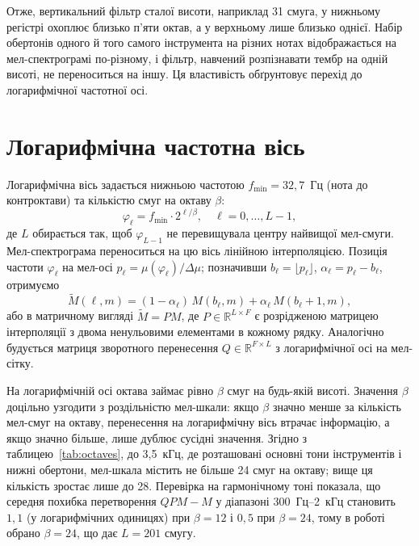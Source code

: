 Отже, вертикальний фільтр сталої висоти, наприклад 31 смуга, у нижньому
регістрі охоплює близько п'яти октав, а у верхньому лише близько однієї.
Набір обертонів одного й того самого інструмента на різних нотах
відображається на мел-спектрограмі по-різному, і фільтр, навчений
розпізнавати тембр на одній висоті, не переноситься на іншу. Ця
властивість обґрунтовує перехід до логарифмічної частотної осі.

\section{Логарифмічна частотна вісь}
\label{sec:logaxis}

Логарифмічна вісь задається нижньою частотою $f_{\min} = 32{,}7$~Гц (нота
до контроктави) та кількістю смуг на октаву $\beta$:
\begin{equation}
    \varphi_\ell = f_{\min} \cdot 2^{\ell / \beta}, \quad \ell = 0, \ldots, L-1,
\end{equation}
де $L$ обирається так, щоб $\varphi_{L-1}$ не перевищувала центру
найвищої мел-смуги. Мел-спектрограма переноситься на цю вісь лінійною
інтерполяцією. Позиція частоти $\varphi_\ell$ на мел-осі
$p_\ell = \mu(\varphi_\ell) / \Delta\mu$; позначивши
$b_\ell = \lfloor p_\ell \rfloor$, $\alpha_\ell = p_\ell - b_\ell$,
отримуємо
\begin{equation}
    \widetilde{M}(\ell, m) = (1 - \alpha_\ell)\, M(b_\ell, m)
    + \alpha_\ell\, M(b_\ell + 1, m),
\end{equation}
або в матричному вигляді $\widetilde{M} = P M$, де $P \in
\mathbb{R}^{L \times F}$ є розрідженою матрицею інтерполяції з двома
ненульовими елементами в кожному рядку. Аналогічно будується матриця
зворотного перенесення $Q \in \mathbb{R}^{F \times L}$ з логарифмічної
осі на мел-сітку.

На логарифмічній осі октава займає рівно $\beta$ смуг на будь-якій
висоті. Значення $\beta$ доцільно узгодити з роздільністю мел-шкали: якщо
$\beta$ значно менше за кількість мел-смуг на октаву, перенесення на
логарифмічну вісь втрачає інформацію, а якщо значно більше, лише
дублює сусідні значення. Згідно з таблицею~\ref{tab:octaves}, до 3,5~кГц,
де розташовані основні тони інструментів і нижні обертони, мел-шкала
містить не більше 24 смуг на октаву; вище ця кількість зростає лише до
28. Перевірка на гармонічному тоні показала, що середня похибка
перетворення $Q P M - M$ у діапазоні 300~Гц--2~кГц становить $1{,}1$ (у
логарифмічних одиницях) при $\beta = 12$ і $0{,}5$ при $\beta = 24$, тому в
роботі обрано $\beta = 24$, що дає $L = 201$ смугу.

